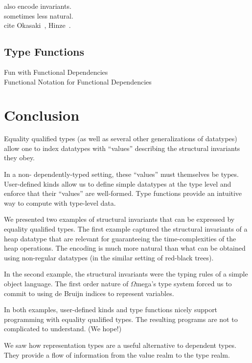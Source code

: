\documentclass[10pt]{article}
\newcommand{\Wmega}{\ensuremath{\Omega}mega}
\begin{document}
	also encode invariants. \\
	sometimes less natural. \\
	cite Okasaki~\cite{okasaki-adventure}, 
	Hinze~\cite{hinze-}. \\

\subsection{Type Functions}
	Fun with Functional Dependencies~\cite{hallgren-fun} \\
	Functional Notation for Functional
		Dependencies~\cite{FunctionalNotation}

\section{Conclusion}

Equality qualified types (as well as several other generalizations of 
  datatypes) allow one to index datatypes with ``values'' describing 
  the structural invariants they obey.

In a non- dependently-typed setting, these ``values'' must themselves 
be types.
User-defined kinds allow us to define simple datatypes at the type level 
  and enforce that their ``values'' are well-formed.
Type functions provide an intuitive way to compute with type-level data. 

We presented two examples of structural invariants that can be expressed 
  by equality qualified types.  The first example captured the structural 
  invariants of a heap datatype that are relevant for guaranteeing the 
  time-complexities of the heap operations.  The encoding is much more 
  natural than what can be obtained using non-regular datatypes (in the 
  similar setting of red-black trees).

In the second example, the structural invariants were the typing 
  rules of a simple object language.  The first order nature of \Wmega{}'s
  type system forced us to commit to using de Bruijn indices to 
  represent variables. 

In both examples, user-defined kinds and type functions nicely support  
  programming with equality qualified types.  The resulting programs 
  are not to complicated to understand. (We hope!)

We saw how representation types are a useful alternative to dependent types. 
  They provide a flow of information from the value realm to the type realm.
\end{document}
